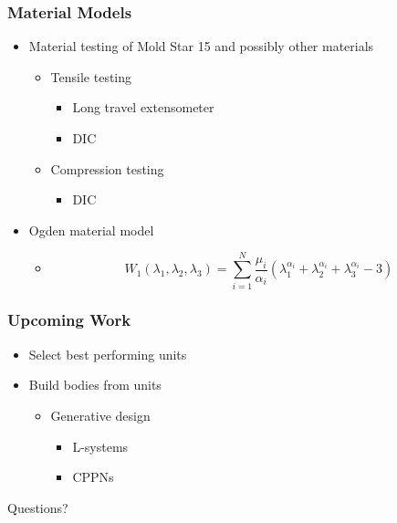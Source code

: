 \documentclass[serif, pdf]{beamer}
\begin{document}
\begin{frame}
    \frametitle{Material Models}
    \begin{itemize}
        \item<1-> Material testing of Mold Star 15 and possibly other materials
        \changefontsizes{11pt}
        \begin{itemize}
            \item<2-> Tensile testing
            \changefontsizes{11pt}
        	\begin{itemize}
            	\item<3-> Long travel extensometer
            	\item<4-> DIC
            \end{itemize}
            \item<5-> Compression testing
            \changefontsizes{11pt}
        	\begin{itemize}
            	\item<6-> DIC
            \end{itemize}
        \end{itemize}
        \item<7-> Ogden material model
        \changefontsizes{11pt}
        \begin{itemize}
            \item<8-> \begin{equation*}
            W_{1}\left(\lambda_{1},\lambda_{2},\lambda_{3}\right)=\sum_{i=1}^{N}\frac{\mu_{i}}{\alpha_{i}}\left(\lambda_{1}^{\alpha_{i}}+\lambda_{2}^{\alpha_{i}}+\lambda_{3}^{\alpha_{i}}-3\right)
            \end{equation*}
        \end{itemize}
    \end{itemize}
\end{frame}


\begin{frame}
    \frametitle{Upcoming Work}
    \begin{itemize}
        \item<1-> Select best performing units
        \item<2-> Build bodies from units
		\begin{itemize}
            \item<3-> Generative design
            \begin{itemize}
            	\item<4-> L-systems
            	\item<5-> CPPNs
            \end{itemize}
        \end{itemize}
    \end{itemize}
\end{frame}


\begin{frame}
    \begin{center}
        \huge Questions?
    \end{center}
\end{frame}
\end{document}
